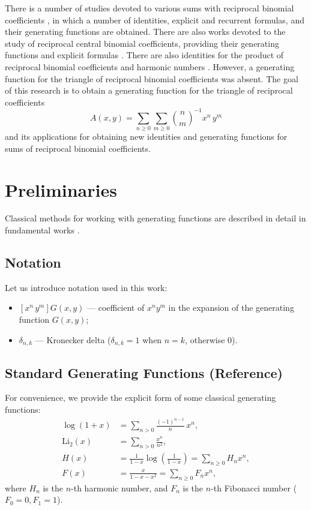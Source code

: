 \documentclass[12pt]{article}
\begin{document}
There is a number of studies devoted to various sums with reciprocal binomial coefficients \cite{Sury1,Pla,Trif,Mansour,Sury2,Ji,Belbachir,Batir22}, in which a number of identities, explicit and recurrent formulas, and their generating functions are obtained. There are also works devoted to the study of reciprocal central binomial coefficients, providing their generating functions and explicit formulas \cite{Sprugnoli,Sofo,Batir22,Bhat2024}. There are also identities for the product of reciprocal binomial coefficients and harmonic numbers \cite{Sofo,Boyadzhiev,Kalmykov}. However, a generating function for the triangle of reciprocal binomial coefficients was absent.
The goal of this research is to obtain a generating function for the triangle of reciprocal coefficients
$$
A(x,y)=\sum_{n\geqslant 0}\sum_{m\geqslant 0} {\binom{n}{m}}^{-1}x^n\,y^m
$$
and its applications for obtaining new identities and generating functions for sums of reciprocal binomial coefficients.

\section{Preliminaries}

Classical methods for working with generating functions are described in detail in fundamental works \cite{Wilf,Stanley,Flajolet}.

\subsection{Notation}
Let us introduce notation used in this work:
\begin{itemize}
    \item $[x^n\,y^m]G(x,y)$ — coefficient of $x^n y^m$ in the expansion of the generating function $G(x,y)$;
    \item $\delta_{n,k}$ — Kronecker delta ($\delta_{n,k}=1$ when $n=k$, otherwise $0$).
\end{itemize}

\subsection{Standard Generating Functions (Reference)}
For convenience, we provide the explicit form of some classical generating functions:
\[
\begin{aligned}
    \log(1+x) &= \sum_{n>0} \frac{(-1)^{n-1}}{n}\,x^n,\\
    \mathrm{Li}_2(x) &= \sum_{n>0} \frac{x^n}{n^2},\\
    H(x) &= \frac{1}{1-x}\log\left(\frac{1}{1-x}\right) = \sum_{n \ge 0} H_n x^n,\\
    F(x) &= \frac{x}{1-x-x^2} = \sum_{n \ge 0} F_n x^n,
\end{aligned}
\]
where $H_n$ is the $n$-th harmonic number, and $F_n$ is the $n$-th Fibonacci number ($F_0=0, F_1=1$).
\end{document}
